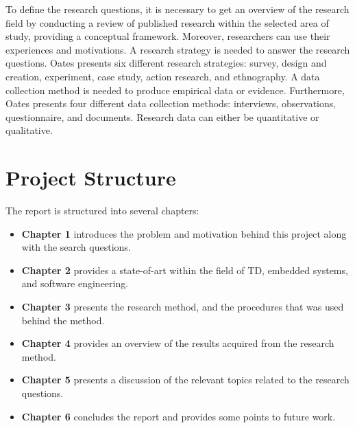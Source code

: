 To define the research questions, it is necessary to get an overview of the research field by conducting a review of published research within the selected area of study, providing a conceptual framework. Moreover, researchers can use their experiences and motivations. A research strategy is needed to answer the research questions. Oates\cite{Oates:2006:RIS:1202299} presents six different research strategies: survey, design and creation, experiment, case study, action research, and ethnography. A data collection method is needed to produce empirical data or evidence. Furthermore, Oates\cite{Oates:2006:RIS:1202299} presents four different data collection methods: interviews, observations, questionnaire, and documents. Research data can either be quantitative or qualitative. 



\section{Project Structure}
The report is structured into several chapters:
\begin{itemize}
	\item \textbf{Chapter 1} introduces the problem and motivation behind this project along with the search questions.
	\item \textbf{Chapter 2} provides a state-of-art within the field of TD, embedded systems, and software engineering.
	\item \textbf{Chapter 3} presents the research method, and the procedures that was used behind the method.
	\item \textbf{Chapter 4} provides an overview of the results acquired from the research method.
	\item \textbf{Chapter 5} presents a discussion of the relevant topics related to the research questions.
	\item \textbf{Chapter 6} concludes the report and provides some points to future work. 
\end{itemize}

